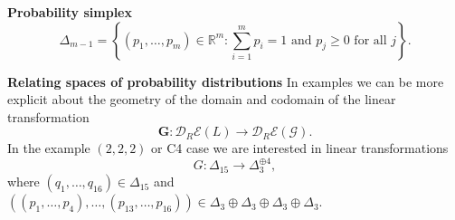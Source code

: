 \begin{frame}
\begin{block}{\textbf{Probability simplex}}
$$
\Delta_{m-1} = \left\{ (p_1, \ldots , p_m) \in \mathbb{R}^m \colon \sum_{i=1}^m p_i = 1 \text{ and } p_j \geq 0 \text{ for all } j \right\}.
$$
\end{block}
\begin{block}{\textbf{Relating spaces of probability distributions}}
In examples we can be more explicit about the geometry of the domain and codomain of the linear transformation
$$\mathbf{G} \colon \mathcal{D}_R\mathcal{E}(L) \rightarrow \mathcal{D}_R\mathcal{E}(\mathcal{G}).$$
In the example $(2,2,2)$ or C4 case we are interested in linear transformations
$$
G \colon \Delta_{15} \longrightarrow \Delta_3^{\oplus 4},
$$
where $(q_1, \ldots, q_{16}) \in \Delta_{15}$ and $((p_1, \ldots , p_4), \ldots, (p_{13},\ldots,p_{16})) \in \Delta_3 \oplus \Delta_3 \oplus \Delta_3 \oplus \Delta_3$.
\end{block}
\end{frame}
